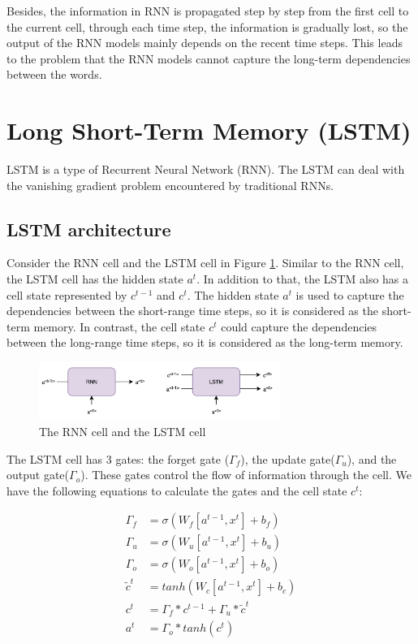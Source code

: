 Besides, the information in RNN is propagated step by step from the first cell to the current cell, through each time step, the information is gradually lost, so the output of the RNN models mainly depends on the recent time steps. This leads to the problem that the RNN models cannot capture the long-term dependencies between the words.

\section{Long Short-Term Memory (LSTM)}
LSTM is a type of Recurrent Neural Network (RNN). The LSTM can deal with the vanishing gradient problem encountered by traditional RNNs. 

\subsection{LSTM architecture}
Consider the RNN cell and the LSTM cell in Figure \ref{fig:rnn_cell_vs_lstm_cell}. Similar to the RNN cell, the LSTM cell has the hidden state $a^{t}$. In addition to that, the LSTM also has a cell state represented by $c^{t-1}$ and $c^{t}$. The hidden state $a^{t}$ is used to capture the dependencies between the short-range time steps, so it is considered as the short-term memory. In contrast, the cell state $c^{t}$ could capture the dependencies between the long-range time steps, so it is considered as the long-term memory.

\begin{figure}[ht]
    \centering
    \includegraphics[width=0.7\textwidth]{Images/5.Theoretical_Background/rnn_vs_lstm_cell.png}
    \caption{The RNN cell and the LSTM cell}
    \label{fig:rnn_cell_vs_lstm_cell}
\end{figure}

The LSTM cell has 3 gates: the forget gate ($\Gamma_f$), the update gate($\Gamma_u$), and the output gate($\Gamma_o$). These gates control the flow of information through the cell. We have the following equations to calculate the gates and the cell state $c^{t}$:

\begin{align}
    \Gamma_f &= \sigma(W_f[a^{t-1}, x^{t}] + b_f) \\
    \Gamma_u &= \sigma(W_u[a^{t-1}, x^{t}] + b_u) \\
    \Gamma_o &= \sigma(W_o[a^{t-1}, x^{t}] + b_o) \\
    \tilde{c}^{t} &= tanh(W_c[a^{t-1}, x^{t}] + b_c) \label{eq:calcuate_c_tilde} \\
    c^{t} &= \Gamma_f * c^{t-1} + \Gamma_u * \tilde{c}^{t} \label{eq:calculate_c}\\
    a^{t} &= \Gamma_o * tanh(c^{t})
\end{align}

